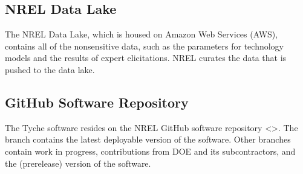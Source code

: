 \documentclass[letterpaper,10pt,english]{sphinxmanual}
\begin{document}
\subsection{NREL Data Lake}
\label{\detokenize{deployment:nrel-data-lake}}
\sphinxAtStartPar
The NREL Data Lake, which is housed on Amazon Web Services (AWS),
contains all of the non\sphinxhyphen{}sensitive data, such as the parameters for
technology models and the results of expert elicitations. NREL curates
the data that is pushed to the data lake.


\subsection{GitHub Software Repository}
\label{\detokenize{deployment:github-software-repository}}
\sphinxAtStartPar
The Tyche software resides on the NREL GitHub software repository
<>. The  branch contains the
latest deployable version of the software. Other branches contain work
in progress, contributions from DOE and its subcontractors, and the
 (pre\sphinxhyphen{}release) version of the software.
\end{document}
